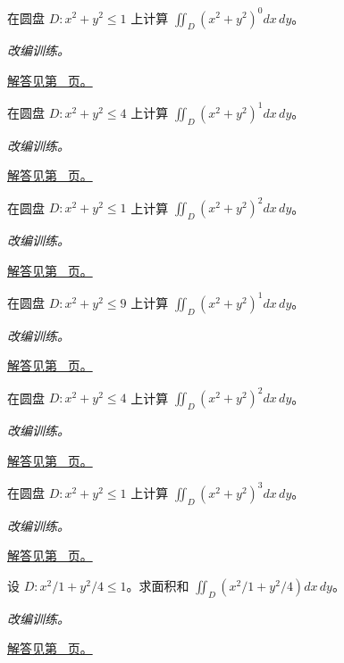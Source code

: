 \documentclass[UTF8,12pt,a4paper,fontset=fandol]{ctexart}
\begin{document}
\begin{example}[圆盘上的径向函数]\label{ex:c36q14}
在圆盘 $D:x^2+y^2\le 1$ 上计算 $\displaystyle\iint_D(x^2+y^2)^{0}dx\,dy$。
\par\textit{改编训练。}\par\hyperref[ans:c36q14]{解答见第~\pageref{ans:c36q14} 页。}
\end{example}
\begin{example}[圆盘上的径向函数]\label{ex:c36q15}
在圆盘 $D:x^2+y^2\le 4$ 上计算 $\displaystyle\iint_D(x^2+y^2)^{1}dx\,dy$。
\par\textit{改编训练。}\par\hyperref[ans:c36q15]{解答见第~\pageref{ans:c36q15} 页。}
\end{example}
\begin{example}[圆盘上的径向函数]\label{ex:c36q16}
在圆盘 $D:x^2+y^2\le 1$ 上计算 $\displaystyle\iint_D(x^2+y^2)^{2}dx\,dy$。
\par\textit{改编训练。}\par\hyperref[ans:c36q16]{解答见第~\pageref{ans:c36q16} 页。}
\end{example}
\begin{example}[圆盘上的径向函数]\label{ex:c36q17}
在圆盘 $D:x^2+y^2\le 9$ 上计算 $\displaystyle\iint_D(x^2+y^2)^{1}dx\,dy$。
\par\textit{改编训练。}\par\hyperref[ans:c36q17]{解答见第~\pageref{ans:c36q17} 页。}
\end{example}
\begin{example}[圆盘上的径向函数]\label{ex:c36q18}
在圆盘 $D:x^2+y^2\le 4$ 上计算 $\displaystyle\iint_D(x^2+y^2)^{2}dx\,dy$。
\par\textit{改编训练。}\par\hyperref[ans:c36q18]{解答见第~\pageref{ans:c36q18} 页。}
\end{example}
\begin{example}[圆盘上的径向函数]\label{ex:c36q19}
在圆盘 $D:x^2+y^2\le 1$ 上计算 $\displaystyle\iint_D(x^2+y^2)^{3}dx\,dy$。
\par\textit{改编训练。}\par\hyperref[ans:c36q19]{解答见第~\pageref{ans:c36q19} 页。}
\end{example}
\begin{example}[椭圆换元与面积矩]\label{ex:c36q20}
设 $D:x^2/1+y^2/4\le1$。求面积和 $\displaystyle\iint_D(x^2/1+y^2/4)dx\,dy$。
\par\textit{改编训练。}\par\hyperref[ans:c36q20]{解答见第~\pageref{ans:c36q20} 页。}
\end{example}
\end{document}
